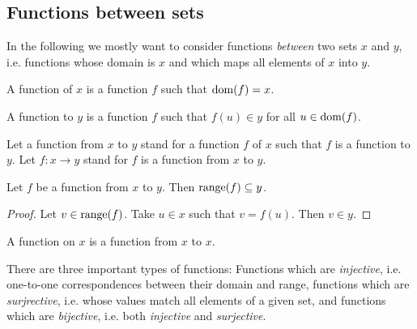 \documentclass[../../set-theory.ftl.tex]{subfiles}
\begin{document}
  \subsection{Functions between sets}

  In the following we mostly want to consider functions \textit{between} two
  sets $x$ and $y$, i.e. functions whose domain is $x$ and which maps all
  elements of $x$ into $y$.

  \begin{forthel}
    \begin{definition}
      A function of $x$ is a function $f$ such that $\operatorname{dom}(f) = x$.
    \end{definition}

    \begin{definition}
      A function to $y$ is a function $f$ such that $f(u) \in y$ for all $u \in \operatorname{dom}(f)$.
    \end{definition}

    Let a function from $x$ to $y$ stand for a function $f$ of $x$ such that $f$ is a function to $y$.
    Let $f: x \to y$ stand for $f$ is a function from $x$ to $y$.

    \begin{proposition}\label{SetTheory_02_01_694542}
      Let $f$ be a function from $x$ to $y$.
      Then $\operatorname{range}(f) \subseteq y$.
    \end{proposition}
    \begin{proof}
      Let $v \in \operatorname{range}(f)$.
      Take $u \in x$ such that $v = f(u)$.
      Then $v \in y$.
    \end{proof}

    \begin{definition}
      A function on $x$ is a function from $x$ to $x$.
    \end{definition}
  \end{forthel}

  \noindent There are three important types of functions:
  Functions which are \textit{injective}, i.e. one-to-one correspondences
  between their domain and range, functions which are \textit{surjrective},
  i.e. whose values match all elements of a given set, and functions which are
  \textit{bijective}, i.e. both \textit{injective} and \textit{surjective}.
\end{document}

